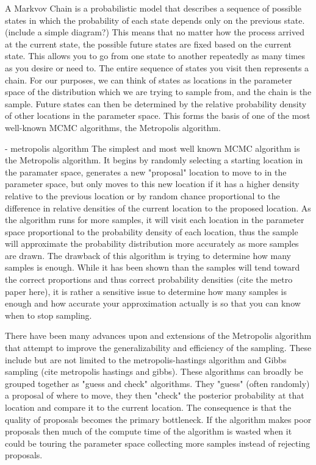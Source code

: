 A Markvov Chain is a probabilistic model that describes a sequence of possible states in which the probability of each state depends only on the previous state. (include a simple diagram?) This means that no matter how the process arrived at the current state, the possible future states are fixed based on the current state. This allows you to go from one state to another repeatedly as many times as you desire or need to. The entire sequence of states you visit then represents a chain. For our purposes, we can think of states as locations in the parameter space of the distribution which we are trying to sample from, and the chain is the sample. Future states can then be determined by the relative probability density of other locations in the parameter space. This forms the basis of one of the most well-known MCMC algorithms, the Metropolis algorithm.

- metropolis algorithm
The simplest and most well known MCMC algorithm is the Metropolis algorithm. It begins by randomly selecting a starting location in the paramater space, generates a new "proposal" location to move to in the parameter space, but only moves to this new location if it has a higher density relative to the previous location or by random chance proportional to the difference in relative densities of the current location to the proposed location. As the algorithm runs for more samples, it will visit each location in the parameter space proportional to the probability density of each location, thus the sample will approximate the probability distribution more accurately as more samples are drawn. The drawback of this algorithm is trying to determine how many samples is enough. While it has been shown than the samples will tend toward the correct proportions and thus correct probability densities (cite the metro paper here), it is rather a sensitive issue to determine how many samples is enough and how accurate your approximation actually is so that you can know when to stop sampling.

There have been many advances upon and extensions of the Metropolis algorithm that attempt to improve the generalizability and efficiency of the sampling. These include but are not limited to the metropolis-hastings algorithm and Gibbs sampling (cite metropolis hastings and gibbs). These algorithms can broadly be grouped together as "guess and check" algorithms. They "guess" (often randomly) a proposal of where to move, they then "check" the posterior probability at that location and compare it to the current location. The consequence is that the quality of proposals becomes the primary bottleneck. If the algorithm makes poor proposals then much of the compute time of the algorithm is wasted when it could be touring the parameter space collecting more samples instead of rejecting proposals.

